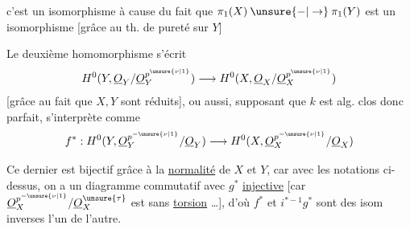 c'est un isomorphisme à cause du fait que
$\pi_1(X)\mathbin{\unsure{-|\to}}\pi_1(Y)$ est un isomorphisme
[grâce au th. de pureté sur $Y$]

Le deuxième homomorphisme s'écrit
\[
H^0(Y,\underline O_Y/\underline O_Y^{p^{\unsure{\nu|1}}})
\longrightarrow
H^0(X,\underline O_X/\underline O_X^{p^{\unsure{\nu|1}}})
\]
[grâce au fait que $X,Y$ sont réduits],
ou aussi, supposant que $k$ est alg. clos donc parfait,
s'interprète comme
\[
f^*:H^0(Y,\underline O_Y^{p^{-\unsure{\nu|1}}}/\underline O_Y)
\longrightarrow
H^0(X,\underline O_X^{p^{-\unsure{\nu|1}}}/\underline O_X)
\]

Ce dernier est bijectif grâce à la \uline{normalité} de $X$ et $Y$,
car  avec les notations ci-dessus, on a un
diagramme commutatif
avec $g^*$ \uline{injective}
[car $\underline O_X^{p^{-\unsure{\nu|1}}}/
\underline O_X^{\unsure{\tau}}$ est 
sans \uline{torsion} \ldots],
d'où $f^*$ et $i^{*-1}g^*$ sont des isom inverses l'un de l'autre.
